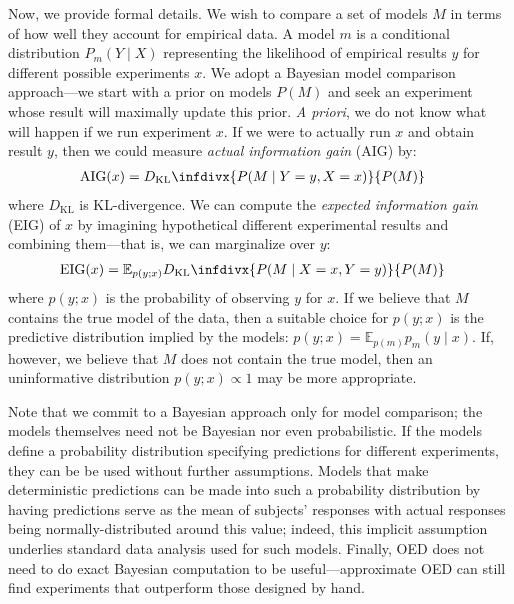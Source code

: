 \documentclass[10pt,letterpaper]{article}
\newcommand{\dkl}{D_\mathrm{KL}\infdivx}
\begin{document}
Now, we provide formal details.
We wish to compare a set of models $M$ in terms of how well they account for empirical data.
A model $m$ is a conditional distribution $P_m(Y \mid X)$ representing the likelihood of empirical results $y$ for different possible experiments $x$.
We adopt a Bayesian model comparison approach---we start with a prior on models $P(M)$ and seek an experiment whose result will maximally update this prior.
\emph{A priori}, we do not know what will happen if we run experiment $x$.
If we were to actually run $x$ and obtain result $y$, then we could measure \emph{actual information gain} (AIG) by:
\begin{align}
  \mathrm{AIG}(x) &= \dkl{P(M \mid Y = y, X = x)}{P(M)} \label{eq:aig}
\end{align}
where $D_\mathrm{KL}$ is KL-divergence. We can compute the \emph{expected information gain} (EIG) of $x$ by imagining hypothetical different experimental results and combining them---that is, we can marginalize over $y$:
\begin{align}
  \mathrm{EIG}(x) &= {\mathbb E}_{p(y ; x)} \dkl{ P(M \mid X = x, Y = y) }{ P(M) }  \label{eq:oed}
\end{align}
where $p(y ; x)$ is the probability of observing $y$ for $x$.
If we believe that $M$ contains the true model of the data, then a suitable choice for $p(y ; x)$ is the predictive distribution implied by the models: $p(y ; x) = {\mathbb E}_{p(m)} p_m(y \mid x)$.
If, however, we believe that $M$ does not contain the true model, then an uninformative distribution $p(y ; x) \propto 1$ may be more appropriate.

Note that we commit to a Bayesian approach only for model comparison; the models themselves need not be Bayesian nor even probabilistic.
If the models define a probability distribution specifying predictions for different experiments, they can be be used without further assumptions.
Models that make deterministic predictions can be made into such a probability distribution by having predictions serve as the mean of subjects' responses with actual responses being normally-distributed around this value; indeed, this implicit assumption underlies standard data analysis used for such models.
Finally, OED does not need to do exact Bayesian computation to be useful---approximate OED can still find experiments that outperform those designed by hand.
\end{document}

